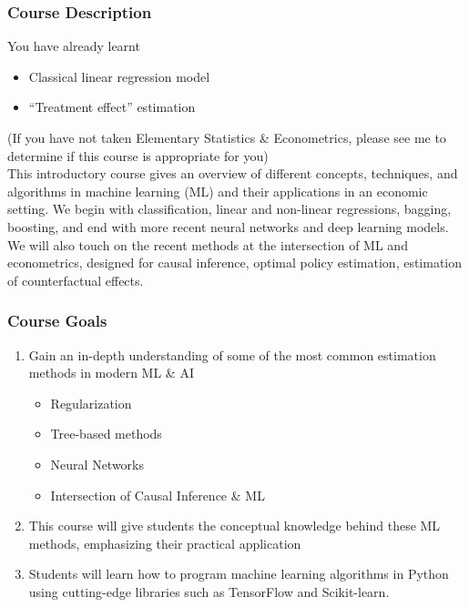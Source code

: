 \documentclass{beamer}
\begin{document}
\begin{frame}\frametitle{Course Description}
    You have already learnt
    \begin{itemize}
        \item Classical linear regression model
        \item ``Treatment effect'' estimation
    \end{itemize}
    (If you have not taken Elementary Statistics  {\&} Econometrics, please see me to determine if this course is appropriate for you) \\
    \vspace{3ex}
This introductory course gives an overview of different concepts, techniques, and algorithms in machine learning (ML) and their applications in an economic setting. We begin with classification, linear and non-linear regressions, bagging, boosting, and end with more recent neural networks and deep learning models. We will also touch on the recent methods at the intersection of ML and econometrics, designed for causal inference, optimal policy estimation, estimation of
counterfactual effects.
\end{frame}

\begin{frame}\frametitle{Course Goals}
    \begin{enumerate}
        \item Gain an in-depth understanding of some of the most common estimation methods in modern ML {\&} AI
        \begin{itemize}
            \item Regularization
            \item Tree-based methods
            \item Neural Networks
            \item Intersection of Causal Inference {\&} ML
        \end{itemize}
        \vspace{2ex} 
        \item This course will give students the conceptual knowledge behind these ML methods, emphasizing their practical application
        \vspace{2ex}
        \item Students will learn how to program machine learning algorithms in Python using cutting-edge libraries such as TensorFlow and Scikit-learn.
    \end{enumerate}
\end{frame}
\end{document}
